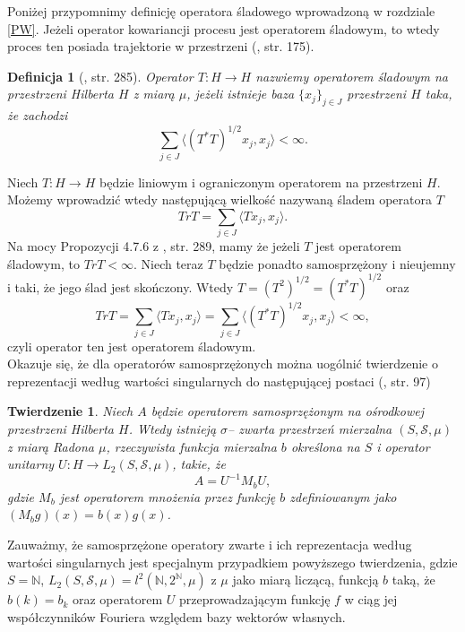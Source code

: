 \documentclass[man,mfiu]{mgrwms}
\newtheorem{tw}{Twierdzenie}[chapter]
\newtheorem{df}{Definicja}[chapter]
\begin{document}
Poniżej przypomnimy definicję operatora śladowego wprowadzoną w rozdziale \ref{PW}. Jeżeli operator kowariancji procesu jest operatorem śladowym, to wtedy proces ten posiada trajektorie w przestrzeni (\cite{typek}, str. 175).
\begin{df}[\cite{hindus}, str. 285] Operator $T\colon H\to H$  nazwiemy operatorem śladowym na przestrzeni Hilberta $H$ z miarą $\mu$, jeżeli istnieje baza $\{x_j\}_{j\in J}$ przestrzeni $H$ taka, że zachodzi
\begin{displaymath}
\sum_{j\in J}\langle (T^*T)^{1/2}x_j,x_j\rangle <\infty.
\end{displaymath}
\end{df}
Niech $T\colon H\to H$ będzie liniowym i ograniczonym operatorem na przestrzeni $H$. Możemy wprowadzić wtedy następującą wielkość nazywaną śladem operatora $T$ 
\begin{displaymath}
TrT=\sum_{j\in J}\langle Tx_j,x_j\rangle.
\end{displaymath} 
Na mocy Propozycji 4.7.6 z \cite{hindus}, str. 289, mamy że jeżeli $T$ jest operatorem śladowym, to $TrT<\infty$. Niech teraz $T$ będzie ponadto samosprzężony i nieujemny i taki, że jego ślad jest skończony. Wtedy $T=(T^2)^{1/2}=(T^*T)^{1/2}$ oraz 
\begin{displaymath}
TrT=\sum_{j\in J}\langle Tx_j,x_j\rangle=\sum_{j\in J}\langle (T^*T)^{1/2}x_j,x_j\rangle <\infty	,
\end{displaymath}
czyli operator ten jest operatorem śladowym.\\
\indent Okazuje się, że dla operatorów samosprzężonych można uogólnić twierdzenie o reprezentacji według wartości singularnych do następującej postaci (\cite{taylor}, str. 97)
\begin{tw}\label{spectral}
Niech $A$ będzie operatorem samosprzężonym na ośrodkowej przestrzeni Hilberta $H$. Wtedy istnieją $\sigma$-- zwarta przestrzeń mierzalna $(S,\mathcal{S},\mu )$ z miarą Radona $\mu$, rzeczywista funkcja mierzalna $b$ określona na $S$ i operator unitarny $U\colon H\to L_2(S,\mathcal{S},\mu )$, takie, że 
\begin{displaymath}
A=U^{-1}M_bU,
\end{displaymath}
gdzie $M_b$ jest operatorem mnożenia przez funkcję $b$ zdefiniowanym jako $(M_bg)(x)=b(x)g(x)$.
\end{tw}
Zauważmy, że samosprzężone operatory zwarte i ich reprezentacja według wartości singularnych jest specjalnym przypadkiem powyższego twierdzenia, gdzie $S=\mathbb{N}$, $L_2(S,\mathcal{S},\mu) =l^2(\mathbb{N},2^{\mathbb{N}},\mu )$ z $\mu$ jako miarą liczącą, funkcją $b$ taką, że $b(k)=b_k$ oraz operatorem $U$ przeprowadzającym funkcję $f$ w ciąg jej współczynników Fouriera względem bazy wektorów własnych.\\
\end{document}
